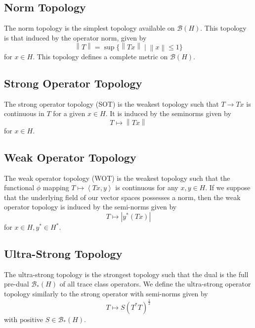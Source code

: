 \documentclass{article}
\theoremstyle{plain}
\theoremstyle{definition}
\newcommand{\abs}[1]{\left\lvert #1 \right\rvert}
\newcommand{\inner}[2]{\left\langle #1, #2 \right\rangle}
\newcommand{\norm}[1]{\left\lVert #1 \right\rVert}
\newcommand{\BH}{\cal{B}(H)}
\newcommand{\PDBH}{\cal{B}_*(H)}
\renewcommand{\cal}[1]{\mathcal{#1}}
\begin{document}
        \subsection{Norm Topology} \label{subsec:norm topology}
                The norm topology is the simplest topology available on $\BH$.
                This topology is that induced by the operator norm, given by
                        $$\norm{T} = \sup\{\norm{Tx} \mid \norm{x} \leq 1\}$$
                for $x \in H$.
                This topology defines a complete metric on $\BH$.

        \subsection{Strong Operator Topology} \label{subsec:SOT}

                The strong operator topology (SOT) is the weakest topology such that $T \to Tx$ is continuous in $T$ for a given $x \in H$.
                It is induced by the seminorms given by 
                        $$T \mapsto \norm{Tx}$$
                for $x \in H$.

        \subsection{Weak Operator Topology} \label{subsec:WOT}
                
                The weak operator topology (WOT) is the weakest topology such that the functional $\phi$ mapping $T \mapsto \inner{Tx}{y}$ is continuous for any $x, y \in H$.
                If we suppose that the underlying field of our vector spaces possesses a norm, then the weak operator topology is induced by the semi-norms given by 
                        $$T \mapsto \abs{y^*(Tx)}$$
                for $x \in H, y^* \in H^*$.

        \subsection{Ultra-Strong Topology} \label{subsec:UST}

                The ultra-strong topology is the strongest topology such that the dual is the full pre-dual $\PDBH$ of all trace class operators.
                We define the ultra-strong operator topology similarly to the strong operator with semi-norms given by 
                        $$T \mapsto S(T^* T)^\frac{1}{2}$$
                with positive $S\in \PDBH$.
\end{document}
